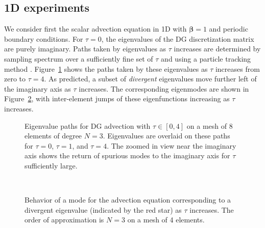 \documentclass[preprint,10pt]{elsarticle}
\newcommand{\note}[1]{{\color{blue}#1}}
\begin{document}
\subsection{1D experiments}

We consider first the scalar advection equation in 1D with $\bm{\beta} = 1$ and periodic boundary conditions.  For $\tau = 0$, the eigenvalues of the DG discretization matrix are purely imaginary.  Paths taken by eigenvalues as $\tau$ increases are determined by sampling \note{spectrum} over a sufficiently fine set of $\tau$ and using a particle tracking method \cite{simpletracker}.  Figure~\ref{fig:track1D} shows the paths taken by these eigenvalues as $\tau$ increases from zero to $\tau = 4$.  As predicted, a subset of \emph{divergent} eigenvalues move further left of the imaginary axis as $\tau$ increases.  The corresponding eigenmodes are shown in Figure~\ref{fig:trackmodes1D}, with inter-element jumps of these eigenfunctions increasing as $\tau$ increases.  

\begin{figure}
\centering
{}
\hspace{1em}
\caption{Eigenvalue paths for DG advection with $\tau \in [0,4]$ on a mesh of 8 elements of degree $N=3$.  Eigenvalues are overlaid on these paths for $\tau = 0$, $\tau = 1$, and $\tau = 4$.  The zoomed in view near the imaginary axis shows the return of spurious modes to the imaginary axis for $\tau$ sufficiently large. }
\label{fig:track1D}
\end{figure}

\begin{figure}
\centering
{}
\hspace{.5em}
\hspace{.5em}
\\
\hspace{.5em}
\hspace{.5em}
\caption{Behavior of a mode for the advection equation corresponding to a divergent eigenvalue (indicated by the red star) as $\tau$ increases.  The order of approximation is $N=3$ on a mesh of 4 elements.} %
\label{fig:trackmodes1D}
\end{figure}
\end{document}
